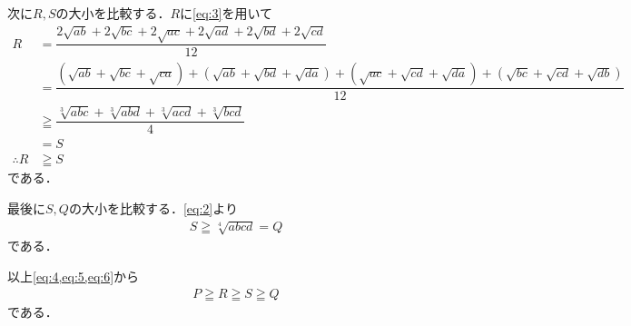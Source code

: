 \documentclass[../../main.tex]{subfiles}
\begin{document}
次に$R,S$の大小を比較する．$R$に\cref{eq:3}を用いて
\begin{align}
  R
  &= \dfrac{2\sqrt{ab} + 2\sqrt{bc} + 2\sqrt{ac} + 2\sqrt{ad} + 2\sqrt{bd} + 2\sqrt{cd}}{12} \\
  &= \dfrac{\left(\sqrt{ab}+\sqrt{bc}+\sqrt{ca}\right)+\left(\sqrt{ab}+\sqrt{bd}+\sqrt{da}\right)+\left(\sqrt{ac}+\sqrt{cd}+\sqrt{da}\right)+\left(\sqrt{bc}+\sqrt{cd}+\sqrt{db}\right)}{12} \\
  & \geqq \dfrac{\sqrt[3]{abc} + \sqrt[3]{abd} + \sqrt[3]{acd} + \sqrt[3]{bcd}}{4} \\
  &= S \\
  \therefore
  R & \geqq S \label{eq:5}
\end{align}
である．

最後に$S, Q$の大小を比較する．\cref{eq:2}より
\begin{align}
  S \geqq \sqrt[4]{abcd} = Q \label{eq:6}
\end{align}
である．

以上\cref{eq:4,eq:5,eq:6}から
\begin{align}
  P \geqq R \geqq S \geqq Q
\end{align}
である．
\end{document}
